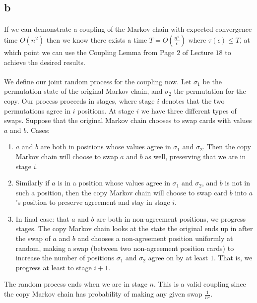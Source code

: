\documentclass[letterpaper,12pt,oneside,onecolumn]{article}
\begin{document}
	\subsection{b}
	\paragraph{}
	If we can demonstrate a coupling of the Markov chain with expected convergence time $O(n^2)$ then we know there exists a time $T = O(\frac{n^2}{\epsilon})$ where $\tau(\epsilon) \leq T$, at which point we can use the Coupling Lemma from Page $2$ of Lecture $18$ to achieve the desired results.
	\paragraph{}
	We define our joint random process for the coupling now. Let $\sigma_1$ be the permutation state of the original Markov chain, and $\sigma_2$ the permutation for the copy. Our process proceeds in stages, where stage $i$ denotes that the two permutations agree in $i$ positions. At stage $i$ we have three different types of swaps. Suppose that the original Markov chain chooses to swap cards with values $a$ and $b$. Cases:
	\begin{enumerate}
		\item $a$ and $b$ are both in positions whose values agree in $\sigma_1$ and $\sigma_2$. Then the copy Markov chain will choose to swap $a$ and $b$ as well, preserving that we are in stage $i$.
		\item Similarly if $a$ is in a position whose values agree in $\sigma_1$ and $\sigma_2$, and $b$ is not in such a position, then the copy Markov chain will choose to swap card $b$ into $a$'s position to preserve agreement and stay in stage $i$.
		\item In final case: that $a$ and $b$ are both in non-agreement positions, we progress stages. The copy Markov chain looks at the state the original ends up in after the swap of $a$ and $b$ and chooses a non-agreement position uniformly at random, making a swap (between two non-agreement position cards) to increase the number of positions $\sigma_1$ and $\sigma_2$ agree on by at least $1$. That is, we progress at least to stage $i+1$.
	\end{enumerate}
	The random process ends when we are in stage $n$. This is a valid coupling since the copy Markov chain has probability of making any given swap $\frac{1}{n^2}$.
\end{document}
